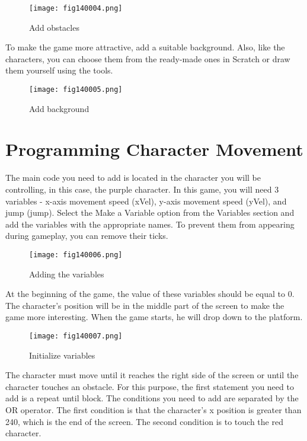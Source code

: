 \begin{figure}[H]
   \centering
   \texttt{[image: fig140004.png]}
   \caption{Add obstacles}
\label{fig140004}
\end{figure}

To make the game more attractive, add a suitable background. Also, like the characters, you can choose them from the ready-made ones in Scratch or draw them yourself using the tools.

\begin{figure}[H]
   \centering
   \texttt{[image: fig140005.png]}
   \caption{Add background}
\label{fig140005}
\end{figure}

\section{Programming Character Movement}

The main code you need to add is located in the character you will be controlling, in this case, the purple character. In this game, you will need 3 variables - x-axis movement speed (xVel), y-axis movement speed (yVel), and jump (jump). Select the Make a Variable option from the Variables section and add the variables with the appropriate names. To prevent them from appearing during gameplay, you can remove their ticks.

\begin{figure}[H]
   \centering
   \texttt{[image: fig140006.png]}
   \caption{Adding the variables}
\label{fig140006}
\end{figure}

At the beginning of the game, the value of these variables should be equal to 0. The character's position will be in the middle part of the screen to make the game more interesting. When the game starts, he will drop down to the platform.

\begin{figure}[H]
   \centering
   \texttt{[image: fig140007.png]}
   \caption{Initialize variables}
\label{fig140007}
\end{figure}

The character must move until it reaches the right side of the screen or until the character touches an obstacle. For this purpose, the first statement you need to add is a repeat until block. The conditions you need to add are separated by the OR operator. The first condition is that the character's x position is greater than 240, which is the end of the screen. The second condition is to touch the red character.

